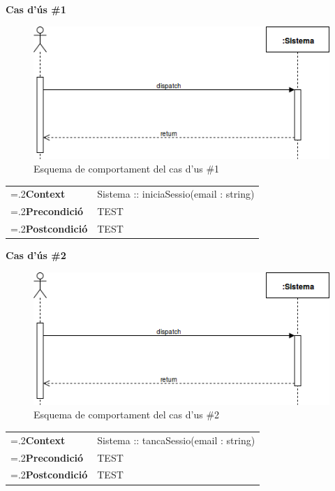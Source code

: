 \noindent\textbf{\large Cas d'ús \#1}\\
\begin{figure}[H]
\centering
\includegraphics[scale=0.6]{Figures/casdus_00.png}
\caption{Esquema de comportament del cas d'us \#1}
\end{figure}
\begin{table}[h]
\noindent
\begin{tabularx}{\linewidth}{
>{\hsize=.2\hsize}X%
>{\hsize=0.8\hsize}X%
}
\textbf{Context} 		& Sistema :: iniciaSessio(email : string) \\
\textbf{Precondició} 	& TEST \\
\textbf{Postcondició}	& TEST \\
\end{tabularx}
\label{}
\end{table}

\noindent\textbf{\large Cas d'ús \#2}\\
\begin{figure}[H]
\centering
\includegraphics[scale=0.6]{Figures/casdus_00.png}
\caption{Esquema de comportament del cas d'us \#2}
\end{figure}
\begin{table}[h]
\noindent
\begin{tabularx}{\linewidth}{
>{\hsize=.2\hsize}X%
>{\hsize=0.8\hsize}X%
}
\textbf{Context} 		& Sistema :: tancaSessio(email : string) \\
\textbf{Precondició} 	& TEST \\
\textbf{Postcondició}	& TEST \\
\end{tabularx}
\label{}
\end{table}

